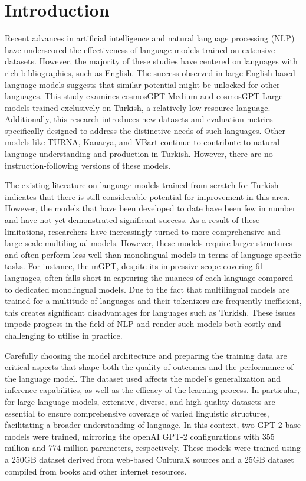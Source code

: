 \documentclass[conference]{IEEEtran}
\begin{document}
\section{Introduction}
Recent advances in artificial intelligence and natural language processing (NLP) have underscored the effectiveness of language models trained on extensive datasets. 
However, the majority of these studies have centered on languages with rich bibliographies, such as English. 
The success observed in large English-based language models suggests that similar potential might be unlocked for other languages. 
This study examines cosmosGPT Medium and cosmosGPT Large models trained exclusively on Turkish, a relatively low-resource language. 
Additionally, this research introduces new datasets and evaluation metrics specifically designed to address the distinctive needs of such languages. 
Other models like TURNA\cite{uludougan2024turna}, Kanarya\cite{safaya-etal-2022-mukayese}, and VBart\cite{turker2024vbart} continue to contribute to natural language understanding and production in Turkish. 
However, there are no instruction-following versions of these models.



The existing literature on language models trained from scratch for Turkish indicates that there is still considerable potential for improvement in this area. 
However, the models that have been developed to date have been few in number and have not yet demonstrated significant success. 
As a result of these limitations, researchers have increasingly turned to more comprehensive and large-scale multilingual models. 
However, these models require larger structures and often perform less well than monolingual models in terms of language-specific tasks. 
For instance, the mGPT\cite{shliazhko2024mgpt}, despite its impressive scope covering 61 languages, often falls short in capturing the nuances of each language compared to dedicated monolingual models. 
Due to the fact that multilingual models are trained for a multitude of languages and their tokenizers are frequently inefficient, this creates significant disadvantages for languages such as Turkish\cite{turker2024vbart}. These issues impede progress in the field of NLP and render such models both costly and challenging to utilise in practice.

Carefully choosing the model architecture and preparing the training data are critical aspects that shape both the quality of outcomes and the performance of the language model. 
The dataset used affects the model’s generalization and inference capabilities, as well as the efficacy of the learning process. 
In particular, for large language models, extensive, diverse, and high-quality datasets are essential to ensure comprehensive coverage of varied linguistic structures, facilitating a broader understanding of language.
In this context, two GPT-2 base models \cite{radford2019language} were trained, mirroring the openAI GPT-2 configurations with 355 million and 774 million parameters, respectively. 
These models were trained using a 250GB dataset derived from web-based CulturaX \cite{nguyen2023culturax} sources and a 25GB dataset compiled from books and other internet resources. 
\end{document}
